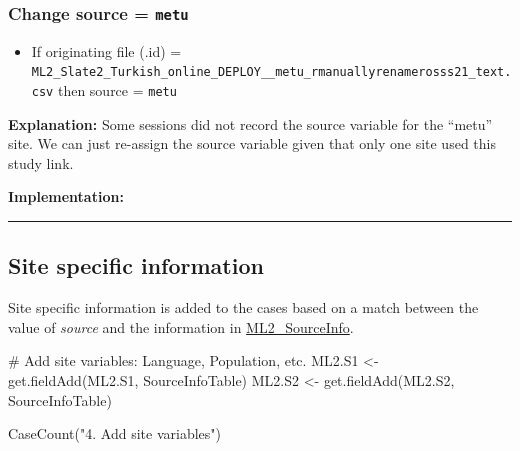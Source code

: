 \documentclass[]{article}
\newenvironment{Shaded}{\begin{snugshade}}{\end{snugshade}}
\newcommand{\KeywordTok}[1]{\textcolor[rgb]{0.94,0.87,0.69}{{#1}}}
\newcommand{\DecValTok}[1]{\textcolor[rgb]{0.86,0.86,0.80}{{#1}}}
\newcommand{\StringTok}[1]{\textcolor[rgb]{0.80,0.58,0.58}{{#1}}}
\newcommand{\CommentTok}[1]{\textcolor[rgb]{0.50,0.62,0.50}{{#1}}}
\newcommand{\NormalTok}[1]{\textcolor[rgb]{0.80,0.80,0.80}{{#1}}}
\begin{document}
\subsubsection{\textbf{Change} source =
\texttt{metu}}\label{change-source-metu}

\begin{itemize}
\itemsep1pt\parskip0pt
\item
  If originating file (.id) =
  \texttt{ML2\_Slate2\_Turkish\_online\_DEPLOY\_\_metu\_rmanuallyrenamerosss21\_text.csv}
  then source = \texttt{metu}
\end{itemize}

\textbf{Explanation:} Some sessions did not record the source variable
for the ``metu'' site. We can just re-assign the source variable given
that only one site used this study link.

\textbf{Implementation:}

\begin{Shaded}
\end{Shaded}

\begin{center}\rule{0.5\linewidth}{\linethickness}\end{center}

\subsection{Site specific information}\label{site-specific-information}

Site specific information is added to the cases based on a match between
the value of \emph{source} and the information in
\href{https://docs.google.com/spreadsheets/d/1Qn_kVkVGwffBAmhAbpgrTjdxKLP1bb2chHjBMVyGl1s/}{ML2\_SourceInfo}.

\begin{Shaded}
\begin{Highlighting}[]
\CommentTok{# Add site variables: Language, Population, etc.}
\NormalTok{ML2.S1 <-}\StringTok{ }\KeywordTok{get.fieldAdd}\NormalTok{(ML2.S1, SourceInfoTable)}
\NormalTok{ML2.S2 <-}\StringTok{ }\KeywordTok{get.fieldAdd}\NormalTok{(ML2.S2, SourceInfoTable)}

\KeywordTok{CaseCount}\NormalTok{(}\StringTok{"4. Add site variables"}\NormalTok{)}
\end{Highlighting}
\end{Shaded}
\end{document}
